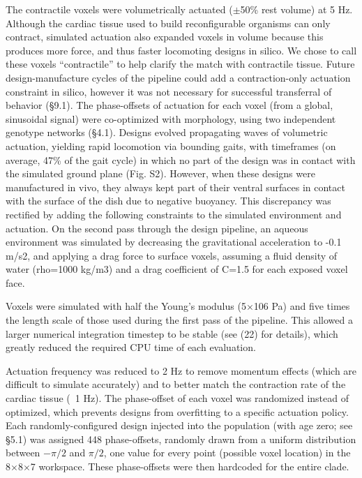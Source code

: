 The contractile voxels were volumetrically actuated ({$\pm$}50\% rest volume) at 5 Hz. Although the cardiac tissue used to build reconfigurable organisms can only contract, simulated actuation also expanded voxels in volume because this produces more force, and thus faster locomoting designs in silico. We chose to call these voxels ``contractile'' to help clarify the match with contractile tissue. Future design-manufacture cycles of the pipeline could add a contraction-only actuation constraint in silico, however it was not necessary for successful transferral of behavior (§9.1).
The phase-offsets of actuation for each voxel (from a global, sinusoidal signal) were co-optimized with morphology, using two independent genotype networks (§4.1). Designs evolved propagating waves of volumetric actuation, yielding rapid locomotion via bounding gaits, with timeframes (on average, 47\% of the gait cycle) in which no part of the design was in contact with the simulated ground plane (Fig. S2). However, when these designs were manufactured in vivo, they always kept part of their ventral surfaces in contact with the surface of the dish due to negative buoyancy. 
This discrepancy was rectified by adding the following constraints to the simulated environment and actuation. On the second pass through the design pipeline, an aqueous environment was simulated by decreasing the gravitational acceleration to -0.1 m/s2, and applying a drag force to surface voxels, assuming a fluid density of water (rho=1000 kg/m3) and a drag coefficient of C=1.5 for each exposed voxel face. 

Voxels were simulated with half the Young's modulus (5{$\times$}106 Pa) and five times the length scale of those used during the first pass of the pipeline. This allowed a larger numerical integration timestep to be stable (see (22) for details), which greatly reduced the required CPU time of each evaluation. 

Actuation frequency was reduced to 2 Hz to remove momentum effects (which are difficult to simulate accurately) and to better match the contraction rate of the cardiac tissue (~1 Hz). The phase-offset of each voxel was randomized instead of optimized, which prevents designs from overfitting to a specific actuation policy. Each randomly-configured design injected into the population (with age zero; see §5.1) was assigned 448 phase-offsets, randomly drawn from a uniform distribution between {$-\pi/2$} and {$\pi/2$}, one value for every point (possible voxel location) in the 8{$\times$}8{$\times$}7 workspace. These phase-offsets were then hardcoded for the entire clade.

